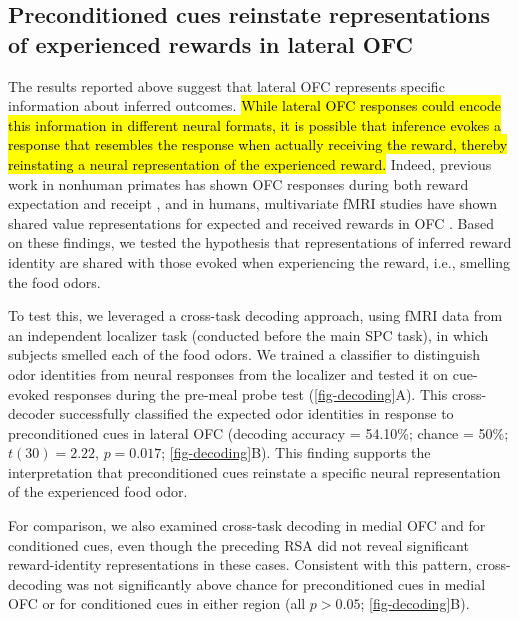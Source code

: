 \documentclass[9pt,twocolumn,twoside]{pnas-new}
\begin{document}
\subsection*{Preconditioned cues reinstate representations of experienced rewards in lateral OFC}

The results reported above suggest that lateral OFC represents specific information about inferred outcomes. \hl{While lateral OFC responses could encode this information in different neural formats, it is possible that inference evokes a response that resembles the response when actually receiving the reward, thereby reinstating a neural representation of the experienced reward.} Indeed, previous work in nonhuman primates has shown OFC responses during both reward expectation and receipt \cite{tremblay1999relative}, and in humans, multivariate fMRI studies have shown shared value representations for expected and received rewards in OFC \cite{RN1,kahnt2011decoding}. Based on these findings, we tested the hypothesis that representations of inferred reward identity are shared with those evoked when experiencing the reward, i.e., smelling the food odors.

To test this, we leveraged a cross-task decoding approach, using fMRI data from an independent localizer task (conducted before the main SPC task), in which subjects smelled each of the food odors. We trained a classifier to distinguish odor identities from neural responses from the localizer and tested it on cue-evoked responses during the pre-meal probe test (\autoref{fig-decoding}A). This cross-decoder successfully classified the expected odor identities in response to preconditioned cues in lateral OFC (decoding accuracy = 54.10\%; chance = 50\%; $t(30) = 2.22$, $p = 0.017$; \autoref{fig-decoding}B). This finding supports the interpretation that preconditioned cues reinstate a specific neural representation of the experienced food odor.

For comparison, we also examined cross-task decoding in medial OFC and for conditioned cues, even though the preceding RSA did not reveal significant reward-identity representations in these cases. Consistent with this pattern, cross-decoding was not significantly above chance for preconditioned cues in medial OFC or for conditioned cues in either region (all $p > 0.05$; \autoref{fig-decoding}B).
\end{document}
